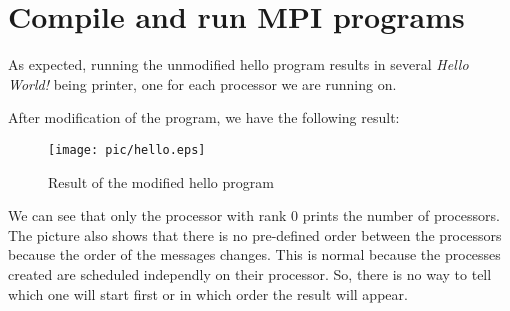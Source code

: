 \chapter{Compile and run MPI programs}

As expected, running the unmodified hello program results in several \textit{Hello World!} being printer, one for each processor we are running on.

After modification of the program, we have the following result:
\begin{figure}[!h]
\begin{center}
	\texttt{[image: pic/hello.eps]}
	\caption{Result of the modified hello program}
\end{center}
\end{figure}

We can see that only the processor with rank 0 prints the number of processors. The picture also shows that there is no pre-defined order between the processors because the order of the messages changes. This is normal because the processes created are scheduled independly on their processor. So, there is no way to tell which one will start first or in which order the result will appear.

